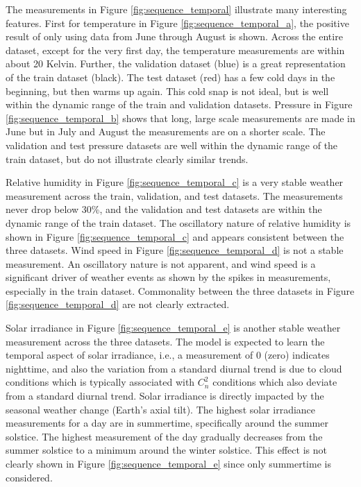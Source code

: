 The measurements in Figure \ref{fig:sequence_temporal} illustrate many interesting features. First for temperature in Figure \ref{fig:sequence_temporal_a}, the positive result of only using data from June through August is shown. Across the entire dataset, except for the very first day, the temperature measurements are within about 20 Kelvin. Further, the validation dataset (blue) is a great representation of the train dataset (black). The test dataset (red) has a few cold days in the beginning, but then warms up again. This cold snap is not ideal, but is well within the dynamic range of the train and validation datasets. Pressure in Figure \ref{fig:sequence_temporal_b} shows that long, large scale measurements are made in June but in July and August the measurements are on a shorter scale. The validation and test pressure datasets are well within the dynamic range of the train dataset, but do not illustrate clearly similar trends.

Relative humidity in Figure \ref{fig:sequence_temporal_c} is a very stable weather measurement across the train, validation, and test datasets. The measurements never drop below 30\%, and the validation and test datasets are within the dynamic range of the train dataset. The oscillatory nature of relative humidity is shown in Figure \ref{fig:sequence_temporal_c} and appears consistent between the three datasets. Wind speed in Figure \ref{fig:sequence_temporal_d} is not a stable measurement. An oscillatory nature is not apparent, and wind speed is a significant driver of weather events as shown by the spikes in measurements, especially in the train dataset. Commonality between the three datasets in Figure \ref{fig:sequence_temporal_d} are not clearly extracted.

Solar irradiance in Figure \ref{fig:sequence_temporal_e} is another stable weather measurement across the three datasets. The model is expected to learn the temporal aspect of solar irradiance, i.e., a measurement of 0 (zero) indicates nighttime, and also the variation from a standard diurnal trend is due to cloud conditions which is typically associated with $C_{n}^{2}$ conditions which also deviate from a standard diurnal trend. Solar irradiance is directly impacted by the seasonal weather change (Earth's axial tilt). The highest solar irradiance measurements for a day are in summertime, specifically around the summer solstice. The highest measurement of the day gradually decreases from the summer solstice to a minimum around the winter solstice. This effect is not clearly shown in Figure \ref{fig:sequence_temporal_e} since only summertime is considered.

